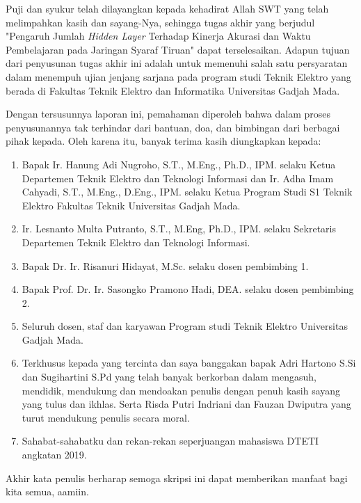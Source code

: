 Puji dan syukur telah dilayangkan kepada kehadirat Allah SWT yang telah melimpahkan kasih dan sayang-Nya, sehingga tugas akhir yang berjudul "Pengaruh Jumlah \textit{Hidden Layer} Terhadap Kinerja
Akurasi dan Waktu Pembelajaran pada Jaringan Syaraf Tiruan" dapat terselesaikan. Adapun tujuan dari penyusunan tugas akhir ini adalah untuk memenuhi salah satu persyaratan dalam menempuh ujian jenjang sarjana pada program studi Teknik Elektro yang berada di Fakultas Teknik Elektro dan Informatika Universitas Gadjah Mada.

Dengan tersusunnya laporan ini, pemahaman diperoleh bahwa dalam proses penyusunannya tak terhindar dari bantuan, doa, dan bimbingan dari berbagai pihak kepada. Oleh karena itu, banyak terima kasih diungkapkan kepada:
\begin{enumerate}
    \item Bapak Ir. Hanung Adi Nugroho, S.T., M.Eng., Ph.D., IPM. selaku Ketua
	Departemen Teknik Elektro dan Teknologi Informasi dan Ir. Adha Imam Cahyadi,
	S.T., M.Eng., D.Eng., IPM. selaku Ketua Program Studi S1 Teknik Elektro
	Fakultas Teknik Universitas Gadjah Mada.
	
    \item Ir. Lesnanto Multa Putranto, S.T., M.Eng, Ph.D., IPM. selaku Sekretaris
	Departemen Teknik Elektro dan Teknologi Informasi.

    \item Bapak Dr. Ir. Risanuri Hidayat, M.Sc. selaku dosen pembimbing 1.
    \item Bapak Prof. Dr. Ir. Sasongko Pramono Hadi, DEA. selaku dosen pembimbing 2.
    \item Seluruh dosen, staf dan karyawan Program studi Teknik 
          Elektro Universitas Gadjah Mada. 
    \item Terkhusus kepada yang tercinta dan saya banggakan bapak Adri Hartono S.Si dan Sugihartini S.Pd yang telah banyak berkorban dalam mengasuh, mendidik, mendukung dan mendoakan penulis dengan penuh kasih sayang yang tulus dan ikhlas. Serta Risda Putri Indriani dan Fauzan Dwiputra yang turut mendukung penulis secara moral.
    \item Sahabat-sahabatku dan rekan-rekan seperjuangan mahasiswa DTETI angkatan 2019.
\end{enumerate}


Akhir kata penulis berharap semoga skripsi ini dapat memberikan manfaat bagi kita semua, aamiin.
